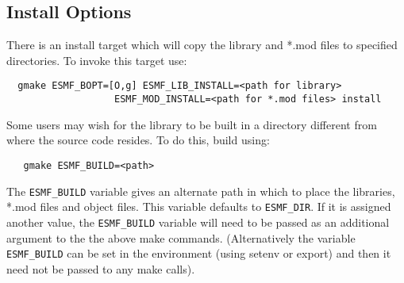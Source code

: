 

\subsection{Install Options}
\label{BuildOptions}

There is an install target which will copy the library and *.mod files to
specified directories.  To invoke this target use:
\begin{verbatim}
  gmake ESMF_BOPT=[O,g] ESMF_LIB_INSTALL=<path for library>
                   ESMF_MOD_INSTALL=<path for *.mod files> install 
\end{verbatim}

Some users may wish for the library to be built in a directory different from 
where the source code resides.  To do this, build using:
\begin{verbatim}
   gmake ESMF_BUILD=<path> 
\end{verbatim}

The {\tt ESMF\_BUILD} variable gives an alternate path in which to
place the libraries, *.mod files and object files.  This variable
defaults to {\tt ESMF\_DIR}.  If it is assigned another value, the
{\tt ESMF\_BUILD} variable will need to be passed as an additional
argument to the the above make commands.  (Alternatively the variable
{\tt ESMF\_BUILD} can be set in the environment (using setenv or
export) and then it need not be passed to any make calls).
